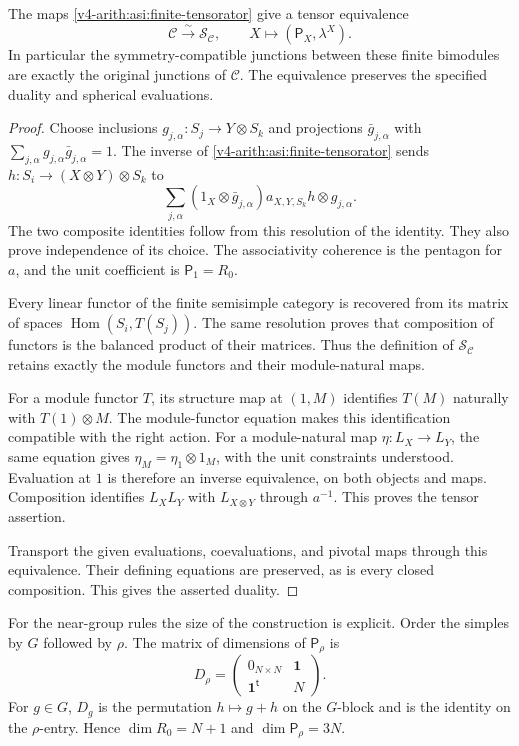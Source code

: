 \begin{theorem}\label{v4-arith:asi:finite-coefficients}
The maps \eqref{v4-arith:asi:finite-tensorator} give a tensor equivalence
\[
 \mathcal C\xrightarrow{\ \sim\ }\mathcal S_{\mathcal C},
 \qquad X\longmapsto(\mathsf P_X,\lambda^X).
\]
In particular the symmetry-compatible junctions between these finite
bimodules are exactly the original junctions of $\mathcal C$.
The equivalence preserves the specified duality and spherical evaluations.
\end{theorem}
\begin{proof}
Choose inclusions $g_{j,\alpha}:S_j\to Y\otimes S_k$ and projections
$\bar g_{j,\alpha}$ with
$\sum_{j,\alpha}g_{j,\alpha}\bar g_{j,\alpha}=1$.
The inverse of \eqref{v4-arith:asi:finite-tensorator} sends
$h:S_i\to(X\otimes Y)\otimes S_k$ to
\[
 \sum_{j,\alpha}
 (1_X\otimes\bar g_{j,\alpha})a_{X,Y,S_k}h
       \otimes g_{j,\alpha}.
\]
The two composite identities follow from this resolution of the identity.
They also prove independence of its choice. The associativity coherence
is the pentagon for $a$, and the unit coefficient is $\mathsf P_1=R_0$.

Every linear functor of the finite semisimple category is recovered
from its matrix of spaces $\operatorname{Hom}(S_i,T(S_j))$.
The same resolution proves that composition of functors is the balanced
product of their matrices. Thus the definition of $\mathcal S_{\mathcal C}$
retains exactly the module functors and their module-natural maps.

For a module functor $T$, its structure map at $(1,M)$ identifies
$T(M)$ naturally with $T(1)\otimes M$. The module-functor equation
makes this identification compatible with the right action.
For a module-natural map $\eta:L_X\to L_Y$, the same equation gives
$\eta_M=\eta_1\otimes1_M$, with the unit constraints understood.
Evaluation at $1$ is therefore an inverse equivalence, on both objects
and maps. Composition identifies $L_XL_Y$ with $L_{X\otimes Y}$
through $a^{-1}$. This proves the tensor assertion.

Transport the given evaluations, coevaluations, and pivotal maps
through this equivalence. Their defining equations are preserved,
as is every closed composition. This gives the asserted duality.
\end{proof}

For the near-group rules the size of the construction is explicit.
Order the simples by $G$ followed by $\rho$. The matrix of dimensions
of $\mathsf P_\rho$ is
\begin{equation}\label{v4-arith:asi:finite-near-group}
 D_\rho=\begin{pmatrix}0_{N\times N}&\mathbf1\\
                         \mathbf1^{\mathsf t}&N\end{pmatrix}.
\end{equation}
For $g\in G$, $D_g$ is the permutation $h\mapsto g+h$ on the
$G$-block and is the identity on the $\rho$-entry. Hence
$\dim R_0=N+1$ and $\dim\mathsf P_\rho=3N$.

